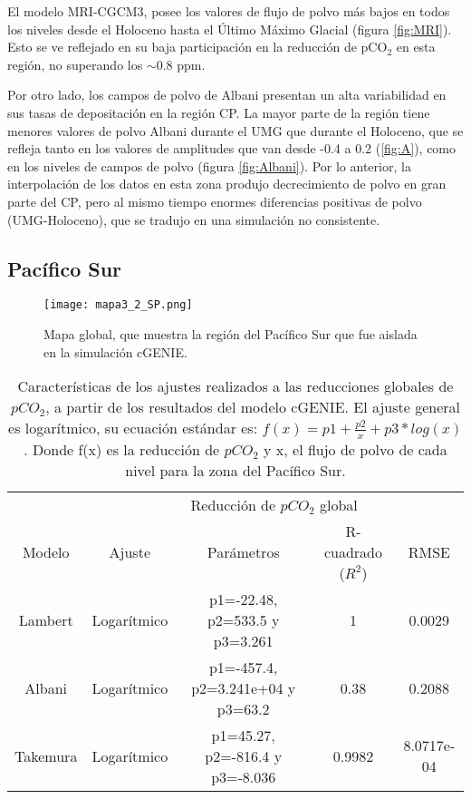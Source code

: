  El modelo MRI-CGCM3, posee los valores de flujo de polvo más bajos en todos los niveles desde el Holoceno hasta el Último Máximo Glacial (figura \ref{fig:MRI}). Esto se ve reflejado en su baja participación en la reducción de pCO$_2$ en esta región, no superando los $\sim 0.8$ ppm. 

Por otro lado, los campos de polvo de Albani presentan un alta variabilidad en sus tasas de depositación en la región CP. La mayor parte de la región tiene menores valores de polvo Albani durante el UMG que durante el Holoceno, que se refleja tanto en los valores de amplitudes que van desde -0.4 a 0.2 (\ref{fig:A}), como en los niveles de campos de polvo (figura \ref{fig:Albani}). Por lo anterior, la interpolación de los datos en esta zona produjo decrecimiento de polvo en gran parte del CP, pero al mismo tiempo enormes diferencias positivas de polvo (UMG-Holoceno), que se tradujo en una simulación no consistente. 

\subsection{Pac\'ifico Sur}

\begin{figure}[H]
\centering
 \texttt{[image: mapa3\_2\_SP.png]}
 \caption[Figura de región del Pacífico Sur]{Mapa global, que muestra la región del Pacífico Sur que fue aislada en la simulación cGENIE.}
  \label{fig:Mapa_SP}
\end{figure}

\begin{table}[H]
\centering
\begin{tabular}{|c|c|c|c|c|}
\hline
& \multicolumn{4}{c|}{Reducci\'on de $pCO_2$ global} \\
\cline{2-5}
Modelo& Ajuste & Par\'ametros & R-cuadrado ($R^2$) & RMSE\\
\hline \hline
Lambert  & Logar\'itmico  & p1=-22.48, p2=533.5 y p3=3.261 & 1 & 0.0029 \\ \hline
Albani & Logar\'itmico & p1=-457.4, p2=3.241e+04 y p3=63.2 &  0.38 & 0.2088\\ \hline
Takemura & Logar\'itmico & p1=45.27, p2=-816.4 y p3=-8.036 & 0.9982 & 8.0717e-04 \\ \hline
\end{tabular}
\caption[Coeficientes de ajustes SP]{Caracter\'isticas de los ajustes realizados a las reducciones globales de $pCO_2$, a partir de los resultados del modelo cGENIE. El ajuste general es logar\'itmico, 
su ecuaci\'on est\'andar es: $ f(x)=p1 + \frac{p2}{x} + p3*log(x)$. Donde f(x) es la reducci\'on de $pCO_2$ y x, el flujo de polvo de cada nivel para la zona del Pacífico Sur.}
\label{tabla:Res4}
\end{table} \newpage

